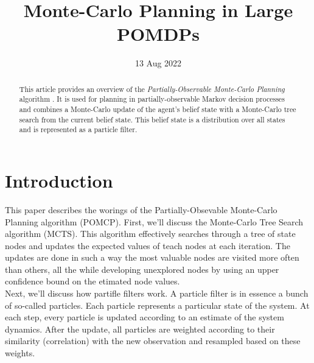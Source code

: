 \documentclass[a4paper,10pt]{article}
\title{	Monte-Carlo Planning in Large POMDPs}
\author{}
\date{13 Aug 2022}
\begin{document}
	\maketitle

\begin{abstract}
	This article provides an overview of the \emph{Partially-Observable	Monte-Carlo Planning} algorithm \cite{silver2010}. It is used for planning in partially-observable Markov decision processes and combines a Monte-Carlo update of the agent's belief state with a Monte-Carlo tree search from the current belief state. This belief state is a distribution over all states and is represented as a particle filter.
\end{abstract}


\section{Introduction}
This paper describes  the worings of the Partially-Obsevable Monte-Carlo Planning algorithm (POMCP). First, we'll discuss the Monte-Carlo Tree Search algorithm (MCTS). This algorithm effectively searches through a tree of state nodes and updates the expected values of teach nodes at each iteration. The updates are done in such a way the most valuable nodes are visited more often than others, all the while developing unexplored nodes by using an upper confidence bound on the etimated node values.\\
Next, we'll discuss how partifle filters work. A particle filter is in essence a bunch of so-called particles. Each particle represents a particular state of the system. At each step, every particle is updated according to an estimate of the system dynamics. After the update, all particles are weighted according to their similarity (correlation) with the new observation and resampled based on these weights.
\end{document}
